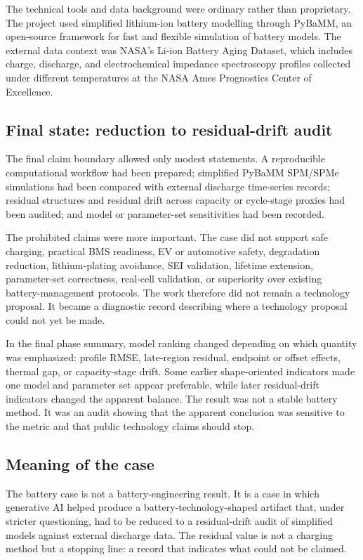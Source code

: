 \documentclass[a4paper,11pt]{article}
\begin{document}
The technical tools and data background were ordinary rather than proprietary. The project used simplified lithium-ion battery modelling through PyBaMM, an open-source framework for fast and flexible simulation of battery models\cite{sulzer2021pybamm}. The external data context was NASA's Li-ion Battery Aging Dataset, which includes charge, discharge, and electrochemical impedance spectroscopy profiles collected under different temperatures at the NASA Ames Prognostics Center of Excellence\cite{nasa_battery}.

\subsection{Final state: reduction to residual-drift audit}

The final claim boundary allowed only modest statements. A reproducible computational workflow had been prepared; simplified PyBaMM SPM/SPMe simulations had been compared with external discharge time-series records; residual structures and residual drift across capacity or cycle-stage proxies had been audited; and model or parameter-set sensitivities had been recorded.

The prohibited claims were more important. The case did not support safe charging, practical BMS readiness, EV or automotive safety, degradation reduction, lithium-plating avoidance, SEI validation, lifetime extension, parameter-set correctness, real-cell validation, or superiority over existing battery-management protocols. The work therefore did not remain a technology proposal. It became a diagnostic record describing where a technology proposal could not yet be made.

In the final phase summary, model ranking changed depending on which quantity was emphasized: profile RMSE, late-region residual, endpoint or offset effects, thermal gap, or capacity-stage drift. Some earlier shape-oriented indicators made one model and parameter set appear preferable, while later residual-drift indicators changed the apparent balance. The result was not a stable battery method. It was an audit showing that the apparent conclusion was sensitive to the metric and that public technology claims should stop.

\subsection{Meaning of the case}

The battery case is not a battery-engineering result. It is a case in which generative AI helped produce a battery-technology-shaped artifact that, under stricter questioning, had to be reduced to a residual-drift audit of simplified models against external discharge data. The residual value is not a charging method but a stopping line: a record that indicates what could not be claimed.
\end{document}
